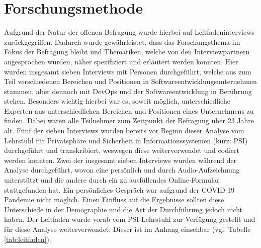 \chapter{Forschungsmethode} %
\label{Research} %

Aufgrund der Natur der offenen Befragung wurde hierbei auf Leitfadeninterviews zurückgegriffen. Dadurch wurde gewährleistet, dass das Forschungsthema im Fokus der Befragung bleibt und Thematiken, welche von 
den Interviewpartnern angesprochen wurden, näher spezifiziert und erläutert werden konnten. Hier wurden insgesamt sieben Interviews mit Personen durchgeführt, welche aus zum Teil verschiedenen Bereichen und
Positionen in Softwareentwicklungsunternehmen stammen, aber dennoch mit DevOps und der Softwareentwicklung in Berührung stehen. \newline \newline
Besonders wichtig hierbei war es, soweit möglich, unterschiedliche Experten aus unterschiedlichen Bereichen und Positionen eines Unternehmens zu finden. Dabei waren alle Teilnehmer zum Zeitpunkt der Befragung 
über 23 Jahre alt. Fünf der sieben Interviews wurden bereits vor Beginn dieser Analyse vom Lehrstuhl für Privatsphäre und Sicherheit in Informationssystemen (kurz: PSI) durchgeführt und transkribiert, 
weswegen diese weiterverwendet und codiert werden konnten. Zwei der insgesamt sieben Interviews wurden während der Analyse durchgeführt, wovon eine persönlich und durch Audio-Aufzeichnung unterstützt und die 
andere durch ein zu ausfüllendes Online-Formular stattgefunden hat. Ein persönliches Gespräch war aufgrund der COVID-19 Pandemie nicht möglich. Einen Einfluss auf die Ergebnisse sollten diese Unterschiede 
in der Demographie und die Art der Durchführung jedoch nicht haben. \newline Der Leitfaden wurde vorab vom PSI-Lehrstuhl zur Verfügung gestellt und für diese Analyse weiterverwendet. Dieser ist im Anhang einsehbar 
(vgl. Tabelle \ref{tab:leitfaden}).

